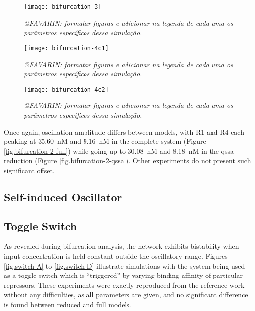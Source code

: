     \begin{figure}[!htbp]
      \centering
      \texttt{[image: bifurcation-3]}
      \caption{\textit{@FAVARIN: formatar figuras e adicionar na legenda de cada uma os parâmetros específicos dessa simulação.}}
      \label{fig.bifurcation-3}
    \end{figure}

    \begin{figure}[!htbp]
      \centering
      \texttt{[image: bifurcation-4c1]}
      \caption{\textit{@FAVARIN: formatar figuras e adicionar na legenda de cada uma os parâmetros específicos dessa simulação.}}
      \label{fig.bifurcation-4c1}
    \end{figure}

    \begin{figure}[!htbp]
      \centering
      \texttt{[image: bifurcation-4c2]}
      \caption{\textit{@FAVARIN: formatar figuras e adicionar na legenda de cada uma os parâmetros específicos dessa simulação.}}
      \label{fig.bifurcation-4c2}
    \end{figure}

    Once again, oscillation amplitude differs between models, with R1 and R4 each peaking at \SI{35.60}{\nano M} and \SI{9.16}{\nano M} in the complete system (Figure \ref{fig.bifurcation-2-full}) while going up to \SI{30.08}{\nano M} and \SI{8.18}{\nano M} in the \ac{qssa} reduction (Figure \ref{fig.bifurcation-2-qssa}).
    Other experiments do not present such significant offset.


  \subsection{Self-induced Oscillator}



  \subsection{Toggle Switch}

    As revealed during bifurcation analysis, the network exhibits bistability when input concentration is held constant outside the oscillatory range.
    Figures \ref{fig.switch-A} to \ref{fig.switch-D} illustrate simulations with the system being used as a toggle switch which is ``triggered'' by varying binding affinity of particular repressors.
    These experiments were exactly reproduced from the reference work without any difficulties, as all parameters are given, and no significant difference is found between reduced and full models.

